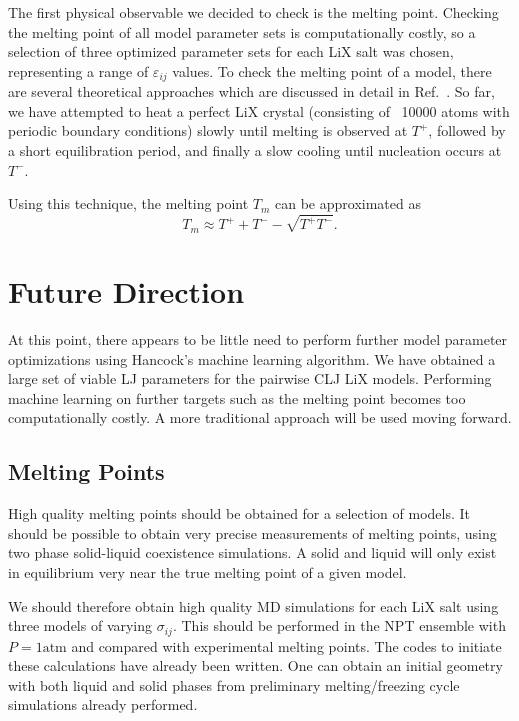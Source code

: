 \documentclass[aip,preprint,amsmath,amssymb,hidelinks]{revtex4-1}
\begin{document}
	The first physical observable we decided to check is the melting point. Checking the melting point of all model parameter sets is computationally costly, so a selection of three optimized parameter sets for each LiX salt was chosen, representing a range of $\varepsilon_{ij}$ values. To check the melting point of a model, there are several theoretical approaches which are discussed in detail in Ref.~. So far, we have attempted to heat a perfect LiX crystal (consisting of ~10000 atoms with periodic boundary conditions) slowly until melting is observed at $T^{+}$, followed by a short equilibration period, and finally a slow cooling until nucleation occurs at $T^{-}$.
	
	Using this technique, the melting point $T_m$ can be approximated as
	\begin{equation}
	T_m \approx T^{+} + T^{-} - \sqrt{T^{+}  T^{-}}.
	\end{equation}
	
	
	\section{Future Direction}
	
	At this point, there appears to be little need to perform further model parameter optimizations using Hancock's machine learning algorithm. We have obtained a large set of viable LJ parameters for the pairwise CLJ LiX models. Performing machine learning on further targets such as the melting point becomes too computationally costly. A more traditional approach will be used moving forward.
	
	
	\subsection{Melting Points}
	
	High quality melting points should be obtained  for a selection of models. It should be possible to obtain very precise measurements of melting points, using two phase solid-liquid coexistence simulations. A solid and liquid will only exist in equilibrium very near the true melting point of a given model.
	
	We should therefore obtain high quality MD simulations for each LiX salt using three models of varying $\sigma_{ij}$. This should be performed in the NPT ensemble with $P = 1 \text{atm}$ and compared with experimental melting points. The codes to initiate these calculations have already been written. One can obtain an initial geometry with both liquid and solid phases from preliminary melting/freezing cycle simulations already performed.
\end{document}
